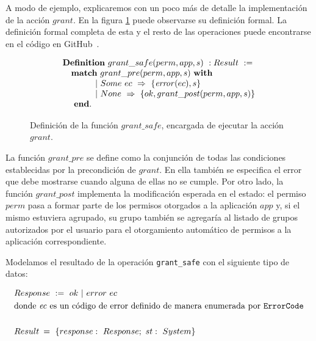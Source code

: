 A modo de ejemplo, explicaremos con un poco más de detalle la implementación de la acción $grant$.
En la figura \ref{fig:install_action} puede observarse su definición formal. La definición formal
completa de esta y el resto de las operaciones puede encontrarse en el código en
GitHub~\cite{github-code}.

\begin{figure}[ht]
    \begin{displaymath}
        \begin{array}{l}
            \textbf{Definition}\ grant\_safe(perm, app, s)\ : Result\ :=                \\
            \quad \textbf{match}\ grant\_pre(perm, app, s)\ \textbf{with}               \\
            \quad \hspace{1cm} |\ Some\ ec\ \Rightarrow\ \{\ap{error}{ec},s\}           \\
            \quad \hspace{1cm} |\ None\ \Rightarrow\ \{ok, grant\_post(perm, app, s) \} \\
            \quad\ \textbf{end}.                                                        \\
        \end{array}
    \end{displaymath}
    \caption{Definición de la función $grant\_safe$, encargada de ejecutar la acción $grant$.}
    \label{fig:install_action}
\end{figure}

La función $grant\_pre$ se define como la conjunción de todas las condiciones establecidas por la
precondición de $grant$. En ella también se especifica el error que debe mostrarse cuando alguna de
ellas no se cumple. Por otro lado, la función $grant\_post$ implementa la modificación esperada en
el estado: el permiso $perm$ pasa a formar parte de los permisos otorgados a la aplicación $app$ y,
si el mismo estuviera agrupado, su grupo también se agregaría al listado de grupos autorizados por
el usuario para el otorgamiento automático de permisos a la aplicación correspondiente.

Modelamos el resultado de la operación \texttt{grant\_safe} con el siguiente tipo de datos:

\begin{align*}
     & Response\ :=\ ok\ |\ error\ ec                                                                     \\
     & \text{donde \textit{ec} es un código de error definido de manera enumerada por \texttt{ErrorCode}} \\ \\
     & Result\:=\ \{response:\ Response;\ st:\ System\}                                                   \\
\end{align*}

